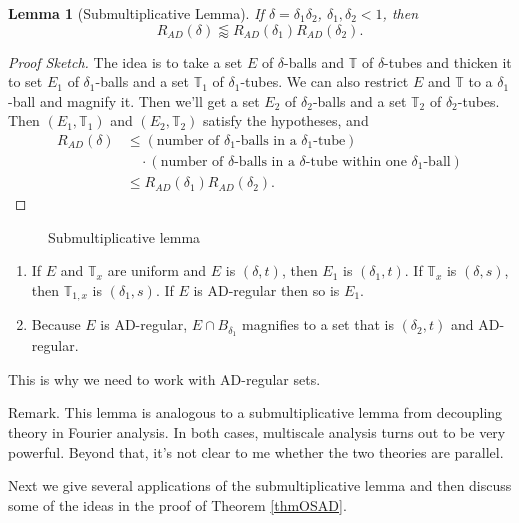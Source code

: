 \documentclass[12pt]{amsart}
\newtheorem{lemma}[theorem]{Lemma}
\begin{document}
\begin{lemma}[Submultiplicative Lemma]
    If $\delta = \delta_1 \delta_2$, $\delta_1, \delta_2 < 1$, then
    \[
        R_{AD}(\delta) \lessapprox R_{AD}(\delta_1) R_{AD}(\delta_2).
    \]
\end{lemma}
\begin{proof}[Proof Sketch]
    The idea is to take a set $E$ of $\delta$-balls and $\mathbb{T}$ of $\delta$-tubes and thicken it to set $E_1$ of $\delta_1$-balls and a set $\mathbb{T}_1$ of $\delta_1$-tubes. We can also restrict $E$ and $\mathbb{T}$ to a $\delta_1$-ball and magnify it. Then we'll get a set $E_2$ of $\delta_2$-balls and a set $\mathbb{T}_2$ of $\delta_2$-tubes. Then $(E_1, \mathbb{T}_1)$ and $(E_2, \mathbb{T}_2)$ satisfy the hypotheses, and
    \begin{align*}
        R_{AD}(\delta) & \leq \left( \text{number of $\delta_1$-balls in a $\delta_1$-tube} \right) \\
        & \quad \cdot \left( \text{number of $\delta$-balls in a $\delta$-tube within one $\delta_1$-ball} \right) \\
        & \leq R_{AD}(\delta_1) R_{AD}(\delta_2).
    \end{align*}
\end{proof}

\begin{figure}
\centering 

\caption{Submultiplicative lemma} 
\end{figure}

\begin{enumerate}
    \item If $E$ and $\mathbb{T}_x$ are uniform and $E$ is $(\delta, t)$, then $E_1$ is $(\delta_1, t)$. If $\mathbb{T}_x$ is $(\delta, s)$, then $\mathbb{T}_{1, x}$ is $(\delta_1, s)$. If $E$ is AD-regular then so is $E_1$.
    \item Because $E$ is AD-regular, $E \cap B_{\delta_1}$ magnifies to a set that is $(\delta_2, t)$ and AD-regular.
\end{enumerate}
This is why we need to work with AD-regular sets.

Remark.  This lemma is analogous to a submultiplicative lemma from decoupling theory in Fourier analysis.  In both cases,  multiscale analysis turns out to be very powerful.   Beyond that,  it's not clear to me whether the two theories are parallel.

Next we give several applications of the submultiplicative lemma and then discuss some of the ideas in the proof of Theorem \ref{thmOSAD}.
\end{document}
